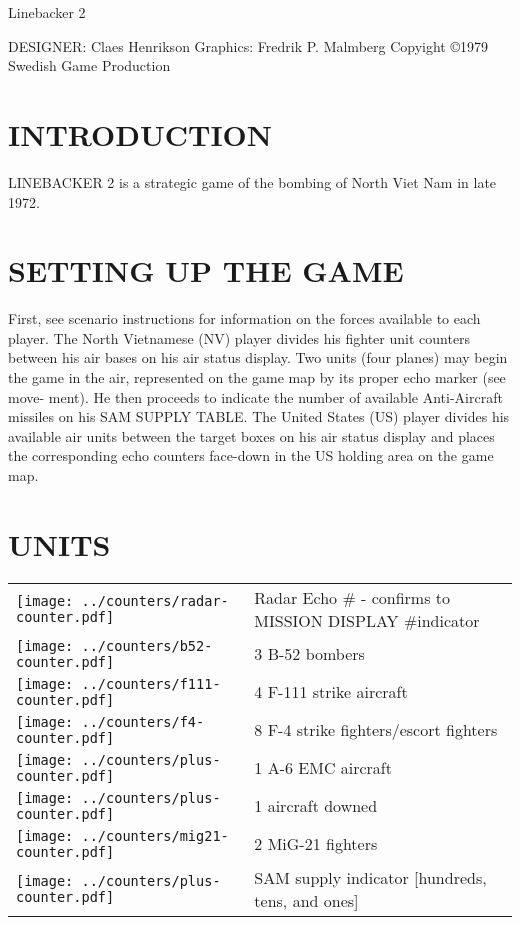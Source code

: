 Linebacker 2

DESIGNER: Claes Henrikson
Graphics: Fredrik P. Malmberg
Copyight ©1979
Swedish Game Production

\section*{INTRODUCTION}
LINEBACKER 2 is a strategic game
of the bombing of North Viet Nam in
late 1972.

\section*{SETTING UP THE GAME}
First, see scenario instructions for
information on the forces available
to each player. The North Vietnamese
(NV) player divides his fighter unit
counters between his air bases on his
air status display. Two units (four
planes) may begin the game in the
air, represented on the game map by
its proper echo marker (see move-
ment). He then proceeds to indicate
the number of available Anti-Aircraft
missiles on his SAM SUPPLY TABLE.
The United States (US) player
divides his available air units between
the target boxes on his air status
display and places the corresponding
echo counters face-down in the US
holding area on the game map.

\newcommand{\bfiftytwo}{\texttt{[image: ../counters/b52-counter.pdf]}}
\newcommand{\ffour}{\texttt{[image: ../counters/f4-counter.pdf]}}
\newcommand{\foneeleven}{\texttt{[image: ../counters/f111-counter.pdf]}}
\newcommand{\plus}{\texttt{[image: ../counters/plus-counter.pdf]}}
\newcommand{\migtwoone}{\texttt{[image: ../counters/mig21-counter.pdf]}}
\newcommand{\radar}{\texttt{[image: ../counters/radar-counter.pdf]}}
\newcommand{\graphic}{\texttt{[image: ../counters/plus-counter.pdf]}}

\section*{UNITS}
\noindent
\begin{tabularx}{\linewidth}{@{} m{0.3in} X @{}}
   \radar & Radar Echo \# - confirms to MISSION DISPLAY \#indicator \\
   \bfiftytwo & 3 B-52 bombers \\
   \foneeleven & 4 F-111 strike aircraft \\
   \ffour & 8 F-4 strike fighters/escort fighters \\
   \plus & 1 A-6 EMC aircraft \\
   \graphic & 1 aircraft downed \\
   \migtwoone & 2 MiG-21 fighters \\
   \graphic & SAM supply indicator [hundreds, tens, and ones] \\
 \end{tabularx}


